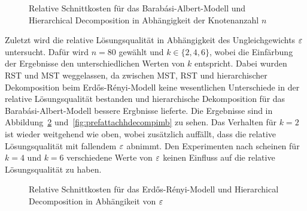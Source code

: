 \begin{figure}[H]
    \centering
    
    \caption{Relative Schnittkosten für das Barabási-Albert-Modell und Hierarchical Decomposition in Abhängigkeit der Knotenanzahl $n$\label{fig:prefattachhdecompnode}}
\end{figure}


%    
%
%    

Zuletzt wird die relative Lösungsqualität in Abhängigkeit des Ungleichgewichts $\varepsilon$ untersucht.
Dafür wird $n=80$ gewählt und $k \in \{2, 4, 6\}$, wobei die Einfärbung der Ergebnisse den unterschiedlichen Werten von $k$ entspricht.
Dabei wurden RST und MST weggelassen, da zwischen MST, RST und hierarchischer Dekomposition beim Erdős-Rényi-Modell keine wesentlichen Unterschiede in der relative Lösungsqualität bestanden und hierarchische Dekomposition für das Barabási-Albert-Modell bessere Ergbnisse lieferte.
Die Ergebnisse sind in Abbildung~\ref{fig:edgeprobhdecompimb} und~\ref{fig:prefattachhdecompimb} zu sehen.
Das Verhalten für $k=2$ ist wieder weitgehend wie oben, wobei zusätzlich auffällt, dass die relative Lösungsqualität mit fallendem $\varepsilon$ abnimmt.
Den Experimenten nach scheinen für $k=4$ und $k=6$ verschiedene Werte von $\varepsilon$ keinen Einfluss auf die relative Lösungsqualität zu haben.


\begin{figure}[H]
    \centering
    
    \caption{Relative Schnittkosten für das Erdős-Rényi-Modell und Hierarchical Decomposition in Abhängikeit von $\varepsilon$\label{fig:edgeprobhdecompimb}}
\end{figure}

%    
%
%    

